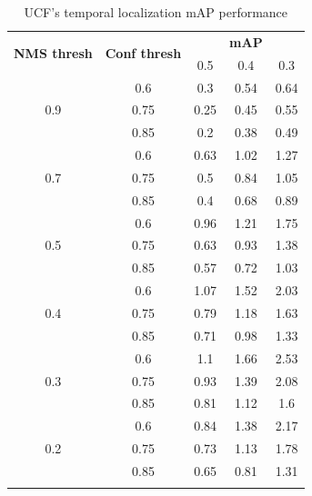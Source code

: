 \documentclass{report}
\begin{document}
\begin{center}
  \begin{longtable}{|| c | c || c c c ||}

    \hline
    \multirow{2}{*}{\textbf{NMS thresh}} & \multirow{2}{*}{\textbf{Conf thresh}} & {} & \textbf{mAP} & {}  \\
    {} & {} & 0.5 & 0.4 & 0.3\\
    \hline
    \multirow{3}{*}{0.9} & {0.6} & 0.3 & 0.54 & 0.64 \\
    \cline{2-5}
    {} & {0.75} & 0.25 & 0.45 & 0.55 \\
    \cline{2-5}
    {} & {0.85} & 0.2 & 0.38 & 0.49  \\
    \hline
    \multirow{3}{*}{0.7} & {0.6} & 0.63 & 1.02 & 1.27 \\
    \cline{2-5}
    {} & {0.75} & 0.5 & 0.84 & 1.05 \\
    \cline{2-5}
    {} & {0.85} & 0.4 & 0.68 & 0.89 \\
    \hline
    \multirow{3}{*}{0.5} & {0.6} & 0.96 & 1.21 & 1.75 \\
    \cline{2-5}
    {} & {0.75} &  0.63 & 0.93 & 1.38 \\
    \cline{2-5}
    {} & {0.85} & 0.57 & 0.72 & 1.03 \\
    \hline
    \multirow{3}{*}{0.4} & {0.6} & 1.07 & 1.52 & 2.03 \\
    \cline{2-5}
    {} & {0.75} &  0.79 & 1.18 & 1.63 \\
    \cline{2-5}
    {} & {0.85} & 0.71 & 0.98 & 1.33 \\
    \hline
    \multirow{3}{*}{0.3} & {0.6} & 1.1 & 1.66 & 2.53 \\
    \cline{2-5}
    {} & {0.75} &  0.93 & 1.39 & 2.08 \\
    \cline{2-5}
    {} & {0.85} & 0.81 & 1.12 & 1.6 \\
    \hline
    \multirow{3}{*}{0.2} & {0.6} & 0.84 & 1.38 & 2.17 \\
    \cline{2-5}
    {} & {0.75} & 0.73 & 1.13 & 1.78 \\
    \cline{2-5}
    {} & {0.85} & 0.65 & 0.81 & 1.31 \\

    \hline

    \caption{UCF's temporal localization mAP performance}
    \label{table:temp_cls_1}
  \end{longtable}
\end{center}
\end{document}
